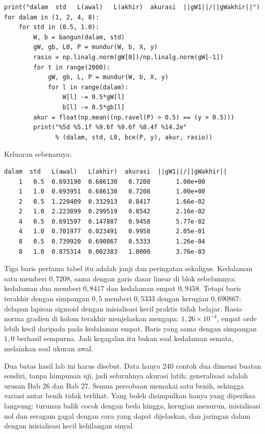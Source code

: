 \begin{lab}
\begin{verbatim}
print("dalam  std   L(awal)   L(akhir)  akurasi  ||gW1||/||gWakhir||")
for dalam in (1, 2, 4, 8):
    for std in (0.5, 1.0):
        W, b = bangun(dalam, std)
        gW, gb, L0, P = mundur(W, b, X, y)
        rasio = np.linalg.norm(gW[0])/np.linalg.norm(gW[-1])
        for t in range(2000):
            gW, gb, L, P = mundur(W, b, X, y)
            for l in range(dalam):
                W[l] -= 0.5*gW[l]
                b[l] -= 0.5*gb[l]
        akur = float(np.mean((np.ravel(P) > 0.5) == (y > 0.5)))
        print("%5d %5.1f %9.6f %9.6f %8.4f %14.2e"
              % (dalam, std, L0, bce(P, y), akur, rasio))
\end{verbatim}
Keluaran sebenarnya:
\begin{verbatim}
dalam  std   L(awal)   L(akhir)  akurasi  ||gW1||/||gWakhir||
    1   0.5  0.693190  0.686130   0.7208       1.00e+00
    1   1.0  0.693951  0.686130   0.7208       1.00e+00
    2   0.5  1.220409  0.332913   0.8417       1.66e-02
    2   1.0  2.223899  0.299519   0.8542       2.16e-02
    4   0.5  0.691597  0.147887   0.9458       5.77e-02
    4   1.0  0.701977  0.023491   0.9958       2.05e-01
    8   0.5  0.739920  0.690867   0.5333       1.26e-04
    8   1.0  0.875314  0.002383   1.0000       3.76e-03
\end{verbatim}
\end{lab}

Tiga baris pertama tabel itu adalah janji dan peringatan sekaligus. Kedalaman satu memberi $0{,}7208$, sama dengan garis dasar linear di blok sebelumnya; kedalaman dua memberi $0{,}8417$ dan kedalaman empat $0{,}9458$. Tetapi baris terakhir dengan simpangan $0{,}5$ memberi $0{,}5333$ dengan kerugian $0{,}690867$:
delapan lapisan sigmoid dengan inisialisasi kecil praktis tidak belajar. Rasio norma gradien di kolom terakhir menjelaskan mengapa:
$1{,}26\times10^{-4}$, empat orde lebih kecil daripada pada kedalaman empat.
Baris yang sama dengan simpangan $1{,}0$ berhasil sempurna. Jadi kegagalan itu bukan soal kedalaman semata, melainkan soal ukuran awal.

Dua batas hasil lab ini harus disebut. Data hanya 240 contoh dua dimensi buatan sendiri, tanpa himpunan uji, jadi seluruhnya akurasi latih; generalisasi adalah urusan Bab 26 dan Bab 27. Semua percobaan memakai satu benih, sehingga variasi antar benih tidak terlihat. Yang boleh
disimpulkan hanya yang diperiksa langsung: turunan balik cocok dengan beda hingga, kerugian
menurun, inisialisasi nol dan seragam gagal dengan cara yang dapat dijelaskan, dan jaringan
dalam dengan inisialisasi kecil kehilangan sinyal.

